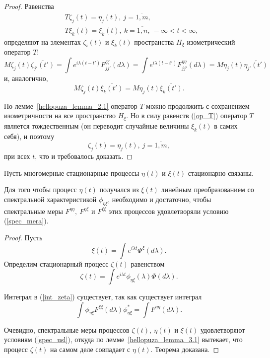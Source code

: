 \begin{proof} Равенства
\begin{equation}
\label{op_T}
\begin{split}
    & T\zeta_j(t) = \eta_j(t), \ j=\overline{1,m}, \\
    & T\xi_k(t) = \xi_k(t), \ k=\overline{1,n}, \ -\infty < t < \infty,
\end{split}
\end{equation}
определяют на элементах $\zeta_i(t)$ и $\xi_k(t)$ пространства $H_\xi$ изометрический оператор $T$: $$M\zeta_j(t)\overline{\zeta_{j'}(t')} = \int e^{i \lambda (t - t')} F^{\zeta\zeta}_{jj'}(d \lambda) = \int e^{i \lambda (t - t')} F^{\eta\eta}_{jj'}(d \lambda) = M \eta_j(t)\overline{\eta_{j'}(t')}$$ и, аналогично, $$M\zeta_j(t)\overline{\xi_k(t')} = M\eta_j(t)\overline{\xi_k(t')}.$$

 По лемме~\ref{hellopuza_lemma_2.1} оператор $T$ можно продолжить с сохранением изометричности на все пространство $H_\xi$. Но в силу равенств (\ref{op_T}) оператор $T$ является тождественным (он переводит случайные величины $\xi_k(t)$ в самих себя), и поэтому $$\zeta_j(t) = \eta_j(t), \ j=\overline{1,m},$$ при всех $t$, что и требовалось доказать.
\end{proof}

\begin{theorem}\label{hellopuza_theor_3.1} Пусть многомерные стационарные процессы $\eta(t)$ и $\xi(t)$ стационарно связаны.

 Для того чтобы процесс $\eta(t)$ получался из $\xi(t)$ линейным преобразованием со спектральной характеристикой $\phi_{\eta\xi}$, необходимо и достаточно, чтобы спектральные меры $F^{\eta\eta}, \ F^{\eta\xi}$ и $F^{\xi\xi}$ этих процессов удовлетворяли условию (\ref{spec_mera}).
\end{theorem}

\begin{proof} Пусть $$\xi(t) = \int e^{i \lambda t} \Phi^\xi(d \lambda).$$ Определим стационарный процесс $\zeta(t)$ равенством 
	\begin{equation} 
		\label{int_zeta} \zeta(t) = \int e^{i \lambda t} \phi_{\eta\xi}(\lambda) \Phi(d \lambda). 
	\end{equation}

 Интеграл в (\ref{int_zeta}) существует, так как существует интеграл $$\int \phi_{\eta\xi}F^{\xi\xi}(d \lambda) \phi^{*}_{\eta\xi} = \int F^{\eta\eta}(d \lambda).$$

 Очевидно, спектральные меры процессов $\zeta(t), \ \eta(t)$ и $\xi(t)$ удовлетворяют условиям (\ref{spec_usl}), откуда по лемме~\ref{hellopuza_lemma_3.1} вытекает, что процесс $\zeta(t)$ на самом деле совпадает с $\eta(t)$. Теорема доказана.
\end{proof}


